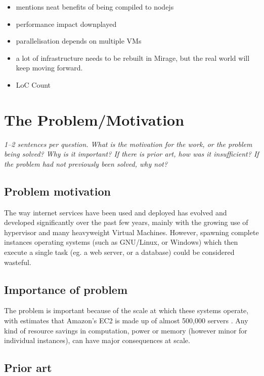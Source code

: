 \documentclass[11pt]{article}
\begin{document}
\begin{itemize}
    \item mentions neat benefits of being compiled to nodejs

    \item performance impact downplayed

    \item parallelisation depends on multiple VMs

    \item a lot of infrastructure needs to be rebuilt in Mirage, but the real
    world will keep moving forward.

    \item LoC Count

\end{itemize}


\section*{The Problem/Motivation}

\textsl{1--2 sentences per question. What is the motivation for the work, or
the problem being solved? Why is it important? If there is prior art, how was
it insufficient? If the problem had not previously been solved, why not?}


\subsection*{Problem motivation}

The way internet services have been used and deployed has evolved and developed
significantly over the past few years, mainly with the growing use of
hypervisor and many heavyweight Virtual Machines. However, spawning complete
instances operating systems (such as GNU/Linux, or Windows) which then execute
a single task (eg. a web server, or a database) could be considered wasteful.


\subsection*{Importance of problem}

The problem is important because of the scale at which these systems operate,
with estimates that Amazon's EC2 is made up of almost 500,000 servers
\cite{EC2Amount}. Any kind of resource savings in computation, power or memory
(however minor for individual instances), can have major consequences at scale.

\subsection*{Prior art}
\end{document}
